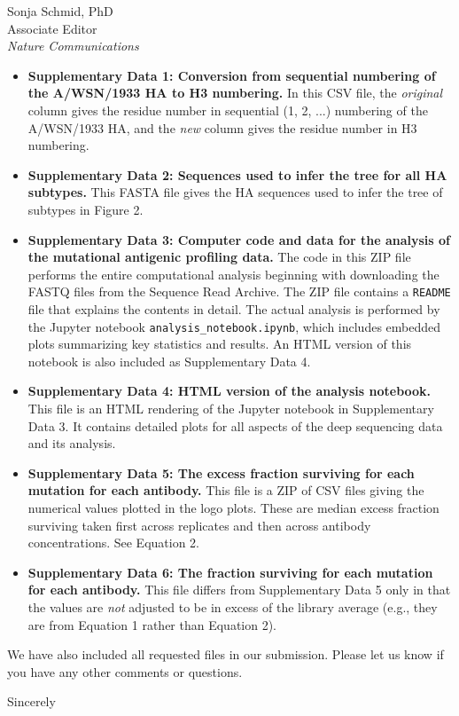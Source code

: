 \documentclass[a4paper,11pt]{letter}
\begin{document}
\begin{letter}{Sonja Schmid, PhD \\ Associate Editor \\ \textit{Nature Communications} }
\begin{itemize}
\begin{itemize}
\item {\bf Supplementary Data 1: Conversion from sequential numbering of the A/WSN/1933 HA to H3 numbering.}
In this CSV file, the \emph{original} column gives the residue number in sequential (1, 2, ...) numbering of the A/WSN/1933 HA, and the \emph{new} column gives the residue number in H3 numbering.

\item {\bf Supplementary Data 2: Sequences used to infer the tree for all HA subtypes.}
This FASTA file gives the HA sequences used to infer the tree of subtypes in Figure 2.

\item {\bf Supplementary Data 3: Computer code and data for the analysis of the mutational antigenic profiling data.}
The code in this ZIP file performs the entire computational analysis beginning with downloading the FASTQ files from the Sequence Read Archive.
The ZIP file contains a \texttt{README} file that explains the contents in detail.
The actual analysis is performed by the Jupyter notebook \texttt{analysis\_notebook.ipynb}, which includes embedded plots summarizing key statistics and results.
An HTML version of this notebook is also included as Supplementary Data 4.

\item {\bf Supplementary Data 4: HTML version of the analysis notebook.}
This file is an HTML rendering of the Jupyter notebook in Supplementary Data 3.
It contains detailed plots for all aspects of the deep sequencing data and its analysis.

\item {\bf Supplementary Data 5: The excess fraction surviving for each mutation for each antibody.}
This file is a ZIP of CSV files giving the numerical values plotted in the logo plots.
These are median excess fraction surviving taken first across replicates and then across antibody concentrations.
See Equation 2.

\item {\bf Supplementary Data 6: The fraction surviving for each mutation for each antibody.}
This file differs from Supplementary Data 5 only in that the values are \emph{not} adjusted to be in excess of the library average (e.g., they are from Equation 1 rather than Equation 2).

\end{itemize}
\end{itemize}

We have also included all requested files in our submission.
Please let us know if you have any other comments or questions.

\closing{Sincerely} %

\end{letter}
\end{document}
